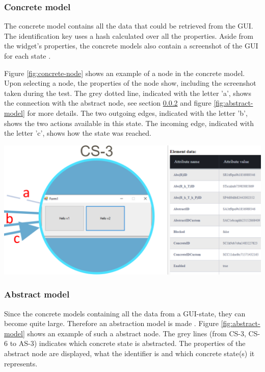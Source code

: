 \subsubsection{Concrete model}
The concrete model contains all the data that could be retrieved from the GUI. The identification key uses a hash calculated over all the properties. Aside from the widget's properties, the concrete models also contain a screenshot of the GUI for each state \cite{thesisMulders}.

Figure \ref{fig:concrete-node} shows an example of a node in the concrete model. Upon selecting a node, the properties of the node show, including the screenshot taken during the test. The grey dotted line, indicated with the letter 'a', shows the connection with the abstract node, see section \ref{abstract-model} and figure \ref{fig:abstract-model} for more details. The two outgoing edges, indicated with the letter 'b', shows the two actions available in this state. The incoming edge, indicated with the letter 'c', shows how the state was reached. 

\bigskip
\begingroup
\captionsetup{type=figure}
\includegraphics[scale=0.5]{images/concrete-model.png}
\label{fig:concrete-node}
\endgroup

\newpage
\subsubsection{Abstract model} \label{abstract-model}
Since the concrete models containing all the data from a GUI-state, they can become quite large.  Therefore an abstraction model is made \cite{thesisMulders}. Figure \ref{fig:abstract-model} shows an example of such a abstract node. The grey lines (from CS-3, CS-6 to AS-3) indicates which concrete state is abstracted. The properties of the abstract node are displayed, what the identifier is and which concrete state(s) it represents.


